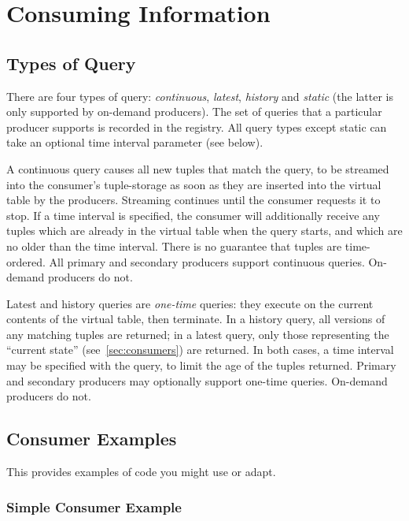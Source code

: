 \section{Consuming Information}

\label{sec:consumer}

\subsection{Types of Query}
There are four types of query: \emph{continuous}, \emph{latest}, {\sl
history} and \emph{static} (the latter is only supported by on-demand
producers). The set of queries that a particular producer supports is
recorded in the registry. All query types except static can take an
optional time interval parameter (see below).

A continuous query causes all new tuples that match the query, to be
streamed into the consumer's tuple-storage as soon as they are
inserted into the virtual table by the producers. Streaming continues
until the consumer requests it to stop. If a time interval is
specified, the consumer will additionally receive any tuples which are
already in the virtual table when the query starts, and which are no
older than the time interval. There is no guarantee that tuples are
time-ordered. All primary and secondary producers support continuous
queries. On-demand producers do not.

Latest and history queries are \emph{one-time} queries: they execute
on the current contents of the virtual table, then terminate. In a
history query, all versions of any matching tuples are returned; in a
latest query, only those representing the ``current state''
(see~\ref{sec:consumers}) are returned. In both cases, a time interval
may be specified with the query, to limit the age of the tuples
returned. Primary and secondary producers may optionally support
one-time queries. On-demand producers do not.

\subsection{Consumer Examples}
This provides  examples of code you might use or adapt.
\subsubsection{Simple Consumer Example}
